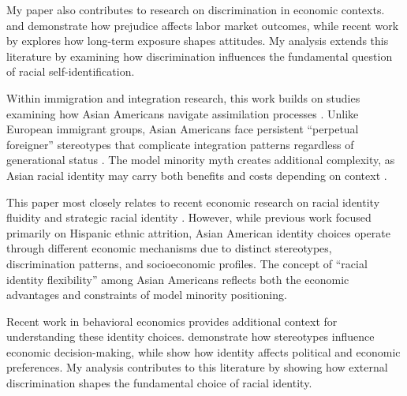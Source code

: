 My paper also contributes to research on discrimination in economic contexts. \textcite{bertrandAreEmilyGreg2004} and \textcite{charlesPrejudiceWagesEmpirical2008} demonstrate how prejudice affects labor market outcomes, while recent work by \textcite{bursztynImmigrantNextDoor2022} explores how long-term exposure shapes attitudes. My analysis extends this literature by examining how discrimination influences the fundamental question of racial self-identification.

Within immigration and integration research, this work builds on studies examining how Asian Americans navigate assimilation processes \autocite{abramitzkyCulturalAssimilationAge2016,abramitzkyNationImmigrantsAssimilation2014}. Unlike European immigrant groups, Asian Americans face persistent ``perpetual foreigner'' stereotypes that complicate integration patterns regardless of generational status \autocite{foukaImmigrantsAmericansRace2022}. The model minority myth creates additional complexity, as Asian racial identity may carry both benefits and costs depending on context \autocite{mengIntermarriageEconomicAssimilation2005}.

This paper most closely relates to recent economic research on racial identity fluidity and strategic racial identity \autocite{hadah2024hispanicidentity, antmanEthnicAttritionObserved2016,antmanIncentivesIdentifyRacial2015,antmanAmericanIndianCasinos2021}. However, while previous work focused primarily on Hispanic ethnic attrition, Asian American identity choices operate through different economic mechanisms due to distinct stereotypes, discrimination patterns, and socioeconomic profiles. The concept of ``racial identity flexibility'' among Asian Americans reflects both the economic advantages and constraints of model minority positioning.

Recent work in behavioral economics provides additional context for understanding these identity choices. \textcite{bordaloStereotypes2016} demonstrate how stereotypes influence economic decision-making, while \textcite{bonomiIdentityBeliefsPolitical2021} show how identity affects political and economic preferences. My analysis contributes to this literature by showing how external discrimination shapes the fundamental choice of racial identity.

